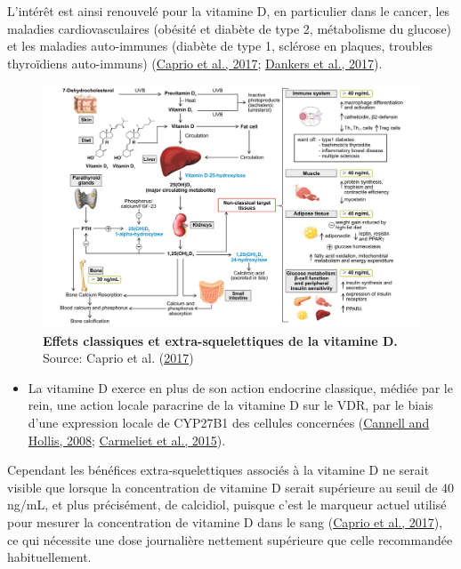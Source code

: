 \documentclass[
  a4paper,
  DIV=11,
  numbers=noendperiod,
  listof=totoc]{scrreprt}
\providecommand{\tightlist}{%
  \setlength{\itemsep}{0pt}\setlength{\parskip}{0pt}}\usepackage{longtable,booktabs,array}
\begin{document}
L'intérêt est ainsi renouvelé pour la vitamine D, en particulier dans le
cancer, les maladies cardiovasculaires (obésité et diabète de type 2,
métabolisme du glucose) et les maladies auto-immunes (diabète de type 1,
sclérose en plaques, troubles thyroïdiens auto-immuns)
(\protect\hyperlink{ref-Caprio.2017}{Caprio et al., 2017};
\protect\hyperlink{ref-Dankers.2017}{Dankers et al., 2017}).

\begin{figure}

{\centering \includegraphics{figures/extra-skeletal-effect.png}

}

\caption{\label{fig-extra-skeletal}\textbf{Effets classiques et
extra-squelettiques de la vitamine D.} Source: Caprio et al.
(\protect\hyperlink{ref-Caprio.2017}{2017})}

\end{figure}

\begin{itemize}
\tightlist
\item
  La vitamine D exerce en plus de son action endocrine classique, médiée
  par le rein, une action locale paracrine de la vitamine D sur le VDR,
  par le biais d'une expression locale de CYP27B1 des cellules
  concernées (\protect\hyperlink{ref-Cannell.2008}{Cannell and Hollis,
  2008}; \protect\hyperlink{ref-Carmeliet.2015}{Carmeliet et al.,
  2015}).
\end{itemize}

Cependant les bénéfices extra-squelettiques associés à la vitamine D ne
serait visible que lorsque la concentration de vitamine D serait
supérieure au seuil de 40 ng/mL, et plus précisément, de calcidiol,
puisque c'est le marqueur actuel utilisé pour mesurer la concentration
de vitamine D dans le sang (\protect\hyperlink{ref-Caprio.2017}{Caprio
et al., 2017}), ce qui nécessite une dose journalière nettement
supérieure que celle recommandée habituellement.
\end{document}
